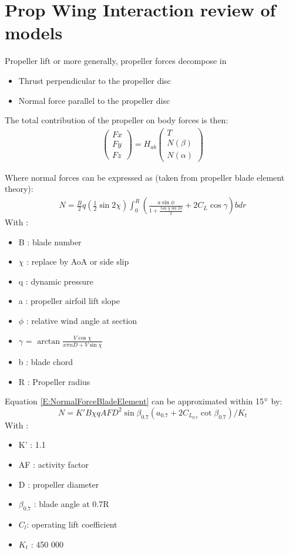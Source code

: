 \section{Prop Wing Interaction review of models}

Propeller lift or more generally, propeller forces decompose in
\begin{itemize}
\item Thrust perpendicular to the propeller disc
\item Normal force parallel to the propeller disc
\end{itemize}

The total contribution of the propeller on body forces is then:
\begin{align}
\begin{pmatrix}
Fx \\
Fy \\
Fz 
\end{pmatrix}
= H_{ab}
\begin{pmatrix}
T\\
N(\beta)\\
N(\alpha)
\end{pmatrix}
\end{align}

Where normal forces can be expressed as (taken from propeller blade element theory):
\begin{align}
N=\frac{B}{2}q\left( \frac{1}{2} \sin 2\chi \right) \int_{0}^{R} \left( \frac{a \sin \phi}{1+ \frac{\tan \chi \sin 2\phi}{2}} + 2C_L \cos \gamma\right) b dr \label{E:NormalForceBladeElement}
\end{align}
With :
\begin{itemize}
\item B : blade number
\item $\chi$ : replace by AoA or side slip
\item q : dynamic pressure
\item a : propeller airfoil lift slope
\item $\phi$ : relative wind angle at section
\item $\gamma$ = $\arctan \frac{V \cos \chi}{x\pi n D + V \sin \chi}$
\item b : blade chord
\item R : Propeller radius
\end{itemize}

Equation \ref{E:NormalForceBladeElement} can be approximated within 15$\degree$ by:
\begin{equation}
N = K' B \chi q AF D^2 \sin \beta_{0.7} (a_{0.7} + 2 C_{L_{0.7}} \cot\beta_{0.7})/ K_t
\end{equation}
With :
\begin{itemize}
\item K' : 1.1
\item AF : activity factor
\item D : propeller diameter
\item $\beta_{0.7}$ : blade angle at 0.7R
\item $C_l$: operating lift coefficient
\item $K_t$ : 450 000
\end{itemize}

